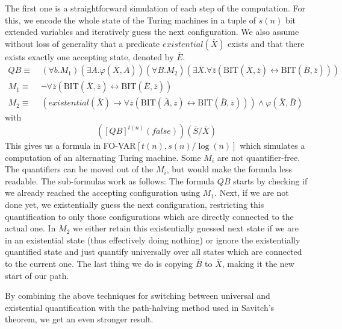 The first one is a straightforward simulation of each step of the computation.
For this, we encode the whole state of the Turing machines in a tuple of $s(n)$ bit extended variables and iteratively guess the next configuration.
We also assume without loss of generality that a predicate $existential(\overline{X})$ exists and that there exists exactly one accepting state, denoted by $\overline{E}$.
\[
    \begin{aligned}
        QB \equiv~&(\forall b.M_{1})(\exists\overline{A}.\varphi(\overline{X}, \overline{A}))(\forall \overline{B}.M_{2})(\exists \overline{X}. \forall \overline{z}(\text{BIT}(\overline{X}, \overline{z}) \leftrightarrow \text{BIT}(\overline{B}, \overline{z}))) \\
        M_{1} \equiv~&\neg\forall \overline{z}(\text{BIT}(\overline{X}, \overline{z}) \leftrightarrow \text{BIT}(\overline{E}, \overline{z})) \\
        M_{2} \equiv~& (existential(\overline{X}) \to \forall \overline{z}(\text{BIT}(\overline{A}, \overline{z}) \leftrightarrow \text{BIT}(\overline{B}, \overline{z}))) \land \varphi(\overline{X}, \overline{B})
    \end{aligned}
\]
with \[
         \left([QB]^{t(n)}(false)\right)(\overline{S} / \overline{X})
\]
This gives us a formula in FO-VAR$[t(n), s(n)/\log(n)]$ which simulates a computation of an alternating Turing machine.
Some $M_i$ are not quantifier-free.
The quantifiers can be moved out of the $M_i$, but would make the formula less readable.
The sub-formulas work as follows: %
The formula $QB$ starts by checking if we already reached the accepting configuration using $M_1$.
Next, if we are not done yet, we existentially guess the next configuration, restricting this quantification to only those configurations which are directly connected to the actual one.
In $M_2$ we either retain this existentially guessed next state if we are in an existential state (thus effectively doing nothing) or ignore the existentially quantified state and just quantify universally over all states which are connected to the current one.
The last thing we do is copying $\overline{B}$ to $\overline{X}$, making it the new start of our path.

By combining the above techniques for switching between universal and existential quantification with the path-halving method used in Savitch's theorem, we get an even stronger result.

